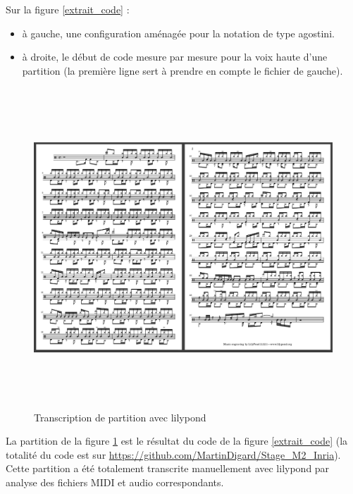 Sur la figure \ref{extrait_code} :
\begin{itemize}
    \item à gauche, une configuration aménagée pour la notation de type agostini.
    \item à droite, le début de code mesure par mesure pour la voix haute
        d’une partition (la première ligne sert à prendre en compte le fichier
        de gauche).
\end{itemize}

\begin{figure}[h]
    \includegraphics[height=120mm, width=160mm]{
    z_images/4_experimentations/1_analyses/3_partition.png}
    \caption{Transcription de partition avec lilypond}
	\label{partition_ref}
\end{figure}

La partition de la figure \ref{partition_ref} est le résultat du code de la
figure \ref{extrait_code} (la totalité du code est sur
\url{https://github.com/MartinDigard/Stage_M2_Inria}). Cette partition a été totalement transcrite
manuellement avec lilypond par analyse des fichiers MIDI et audio
correspondants.

